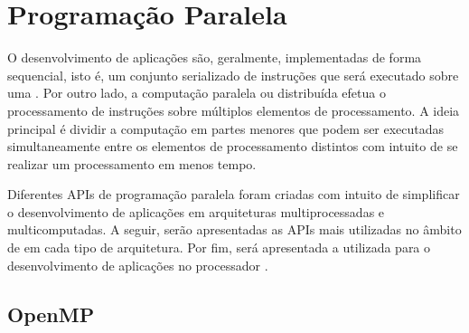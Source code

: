 

\section{Programação Paralela}

O desenvolvimento de aplicações são, geralmente, implementadas de forma
sequencial, isto é, um conjunto serializado de instruções que será executado
sobre uma \cpu. Por outro lado, a computação paralela ou distribuída efetua o
processamento de instruções sobre múltiplos elementos de processamento. A ideia
principal é dividir a computação em partes menores que podem ser executadas
simultaneamente entre os elementos de processamento distintos com intuito de se
realizar um processamento em menos tempo.

Diferentes APIs de programação paralela foram criadas com intuito de simplificar
o desenvolvimento de aplicações em arquiteturas multiprocessadas e multicomputadas.
A seguir, serão apresentadas as APIs mais utilizadas no âmbito de \hpc em cada tipo de
arquitetura. Por fim, será apresentada a \api utilizada para o desenvolvimento de aplicações
no processador \mppa.


\subsection{OpenMP}



